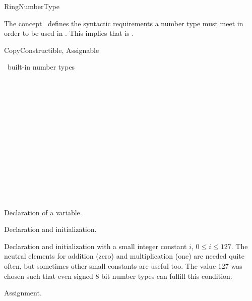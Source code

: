 \begin{ccRefConcept}{RingNumberType}

\ccDefinition

The concept \ccRefName\ defines the syntactic requirements a number type must
meet in order to be used in \cgal.  This implies that
 is 
.

\ccRefines

CopyConstructible, Assignable 


\ccHasModels

\CC\ built-in number types \\
 \\
 \\
 \\
 \\
 \\
 \\
 \\
 \\
 \\
 \\
 \\
 \\
 \\

\ccTypes

\ccSetTwoColumns{}{\hspace*{8.5cm}}
\ccCreation
{}

            {Declaration of a variable.}


            {Declaration and initialization.}


            {Declaration and initialization with a small integer
constant $i$, $0 \leq i \leq 127$. The neutral elements for addition
(zero) and multiplication (one) are needed quite often, but sometimes
other small constants are useful too. The value 127 was chosen such
that even signed 8 bit number types can fulfill this condition.  }

\ccOperations
{}
        {Assignment.  }



\end{ccRefConcept}
